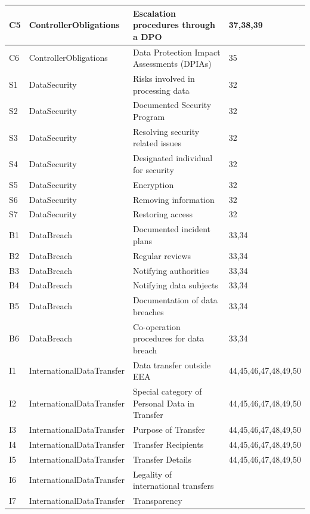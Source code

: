\begin{table}[htbp]
\begin{tabularx}{\textwidth}{|l|l|X|l|}
C5 & ControllerObligations & Escalation procedures through a DPO & 37,38,39 \\ \hline
C6 & ControllerObligations & Data Protection Impact Assessments (DPIAs) & 35 \\ \hline
S1 & DataSecurity & Risks involved in processing data & 32 \\ \hline
S2 & DataSecurity & Documented Security Program & 32 \\ \hline
S3 & DataSecurity & Resolving security related issues & 32 \\ \hline
S4 & DataSecurity & Designated individual for security & 32 \\ \hline
S5 & DataSecurity & Encryption & 32 \\ \hline
S6 & DataSecurity & Removing information & 32 \\ \hline
S7 & DataSecurity & Restoring access & 32 \\ \hline
B1 & DataBreach & Documented incident plans & 33,34 \\ \hline
B2 & DataBreach & Regular reviews & 33,34 \\ \hline
B3 & DataBreach & Notifying authorities & 33,34 \\ \hline
B4 & DataBreach & Notifying data subjects & 33,34 \\ \hline
B5 & DataBreach & Documentation of data breaches & 33,34 \\ \hline
B6 & DataBreach & Co-operation procedures for data breach & 33,34 \\ \hline
I1 & InternationalDataTransfer & Data transfer outside EEA & 44,45,46,47,48,49,50 \\ \hline
I2 & InternationalDataTransfer & Special category of Personal Data in Transfer & 44,45,46,47,48,49,50 \\ \hline
I3 & InternationalDataTransfer & Purpose of Transfer & 44,45,46,47,48,49,50 \\ \hline
I4 & InternationalDataTransfer & Transfer Recipients & 44,45,46,47,48,49,50 \\ \hline
I5 & InternationalDataTransfer & Transfer Details & 44,45,46,47,48,49,50 \\ \hline
I6 & InternationalDataTransfer & Legality of international transfers &  \\ \hline
I7 & InternationalDataTransfer & Transparency &  \\ \hline

\end{tabularx}
\label{table:sparql:dpc-1}
\end{table}

